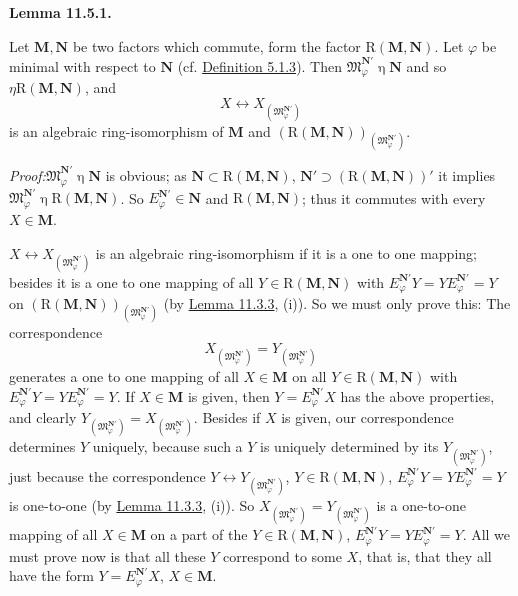 \documentclass[12pt,b5paper,twoside]{article}
\newcommand{\M}{\mathbf M}
\newcommand{\N}{\mathbf N}
\newcommand{\Lemma}[1]{%
  \par\smallskip\noindent\phantomsection\label{lem:#1}\textbf{Lemma #1.}\enspace
}
\newcommand{\Proof}{\par\noindent\textit{Proof:}\enspace}
\newcommand{\defref}[1]{\hyperref[def:#1]{Definition #1}}
\newcommand{\lemref}[1]{\hyperref[lem:#1]{Lemma #1}}
\begin{document}
\Lemma{11.5.1}
Let $\M,\N$ be two factors which commute, form the factor
$\mathrm R(\M,\N)$. Let $\varphi$ be minimal with respect to $\N$ (cf.
\defref{5.1.3}). Then
$\mathfrak M_{\varphi}^{\N'}\mathbin\eta\N$ and so
$\mathbin\eta\mathrm R(\M,\N)$, and
\[
 X\longleftrightarrow X_{(\mathfrak M_{\varphi}^{\N'})}
\]
is an algebraic ring-isomorphism of $\M$ and
$(\mathrm R(\M,\N))_{(\mathfrak M_{\varphi}^{\N'})}$.

\Proof $\mathfrak M_{\varphi}^{\N'}\mathbin\eta\N$ is obvious; as
$\N\subset\mathrm R(\M,\N)$,
$\N'\supset(\mathrm R(\M,\N))'$ it implies
$\mathfrak M_{\varphi}^{\N'}\mathbin\eta\mathrm R(\M,\N)$. So
$E_{\varphi}^{\N'}\in\N$ and $\mathrm R(\M,\N)$; thus it commutes with
every $X\in\M$.

$X\longleftrightarrow X_{(\mathfrak M_{\varphi}^{\N'})}$ is an algebraic
ring-isomorphism if it is a one to one mapping; besides it is a one to one
mapping of all $Y\in\mathrm R(\M,\N)$ with
$E_{\varphi}^{\N'}Y=YE_{\varphi}^{\N'}=Y$ on
$(\mathrm R(\M,\N))_{(\mathfrak M_{\varphi}^{\N'})}$ (by
\lemref{11.3.3}, (i)). So we must only prove this: The correspondence
\[
 X_{(\mathfrak M_{\varphi}^{\N'})}
 =Y_{(\mathfrak M_{\varphi}^{\N'})}
\]
generates a one to one mapping of all $X\in\M$ on all
$Y\in\mathrm R(\M,\N)$ with
$E_{\varphi}^{\N'}Y=YE_{\varphi}^{\N'}=Y$. If $X\in\M$ is given, then
$Y=E_{\varphi}^{\N'}X$ has the above properties, and clearly
$Y_{(\mathfrak M_{\varphi}^{\N'})}
=X_{(\mathfrak M_{\varphi}^{\N'})}$. Besides if $X$ is given, our
correspondence determines $Y$ uniquely, because such a $Y$ is uniquely
determined by its $Y_{(\mathfrak M_{\varphi}^{\N'})}$, just because the
correspondence
$Y\longleftrightarrow Y_{(\mathfrak M_{\varphi}^{\N'})}$,
$Y\in\mathrm R(\M,\N)$,
$E_{\varphi}^{\N'}Y=YE_{\varphi}^{\N'}=Y$ is one-to-one (by
\lemref{11.3.3}, (i)). So
$X_{(\mathfrak M_{\varphi}^{\N'})}
=Y_{(\mathfrak M_{\varphi}^{\N'})}$ is a one-to-one mapping of all
$X\in\M$ on a part of the $Y\in\mathrm R(\M,\N)$,
$E_{\varphi}^{\N'}Y=YE_{\varphi}^{\N'}=Y$. All we must prove now is that
all these $Y$ correspond to some $X$, that is, that they all have the form
$Y=E_{\varphi}^{\N'}X$, $X\in\M$.
\end{document}
